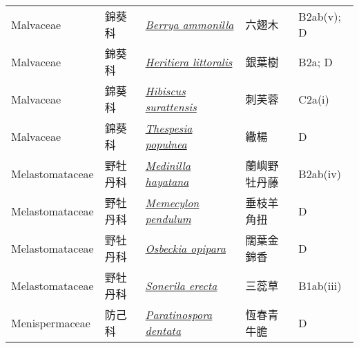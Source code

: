{\begin{longtable}{L{2.5cm}L{2cm}L{5cm}L{2.5cm}L{3cm}}
    Malvaceae & 錦葵科 & \href{http://www.theplantlist.org/tpl1.1/search?q=Berrya+ammonilla}{\textit{Berrya ammonilla} } & 六翅木 & B2ab(v); D    \\
    Malvaceae & 錦葵科 & \href{http://www.theplantlist.org/tpl1.1/search?q=Heritiera+littoralis}{\textit{Heritiera littoralis} } & 銀葉樹 & B2a; D    \\
    Malvaceae & 錦葵科 & \href{http://www.theplantlist.org/tpl1.1/search?q=Hibiscus+surattensis}{\textit{Hibiscus surattensis} } & 刺芙蓉 & C2a(i)    \\
    Malvaceae & 錦葵科 & \href{http://www.theplantlist.org/tpl1.1/search?q=Thespesia+populnea}{\textit{Thespesia populnea} } & 繖楊 & D    \\
    Melastomataceae & 野牡丹科 & \href{http://www.theplantlist.org/tpl1.1/search?q=Medinilla+hayatana}{\textit{Medinilla hayatana} } & 蘭嶼野牡丹藤 & B2ab(iv)    \\
    Melastomataceae & 野牡丹科 & \href{http://www.theplantlist.org/tpl1.1/search?q=Memecylon+pendulum}{\textit{Memecylon pendulum} } & 垂枝羊角扭 & D    \\
    Melastomataceae & 野牡丹科 & \href{http://www.theplantlist.org/tpl1.1/search?q=Osbeckia+opipara}{\textit{Osbeckia opipara} } & 闊葉金錦香 & D    \\
    Melastomataceae & 野牡丹科 & \href{http://www.theplantlist.org/tpl1.1/search?q=Sonerila+erecta}{\textit{Sonerila erecta} } & 三蕊草 & B1ab(iii)    \\
    Menispermaceae & 防己科 & \href{http://www.theplantlist.org/tpl1.1/search?q=Paratinospora+dentata}{\textit{Paratinospora dentata} } & 恆春青牛膽 & D    \\

\end{longtable}}
